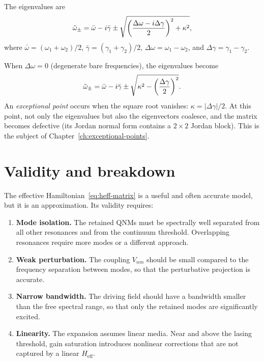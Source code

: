 The eigenvalues are
\begin{equation}
 \tilde{\omega}_\pm = \bar{\omega} - i\bar{\gamma}
 \pm \sqrt{\left(\frac{\Delta\omega - i\Delta\gamma}{2}\right)^2
 + \kappa^2},
 \label{eq:two-mode-evals}
\end{equation}
where $\bar{\omega} = (\omega_1+\omega_2)/2$,
$\bar{\gamma} = (\gamma_1+\gamma_2)/2$,
$\Delta\omega = \omega_1 - \omega_2$, and
$\Delta\gamma = \gamma_1 - \gamma_2$.

When $\Delta\omega = 0$ (degenerate bare frequencies), the eigenvalues
become
\begin{equation}
 \tilde{\omega}_\pm = \bar{\omega} - i\bar{\gamma}
 \pm \sqrt{\kappa^2 - \left(\frac{\Delta\gamma}{2}\right)^2}.
 \label{eq:two-mode-ep}
\end{equation}
An \emph{exceptional point} occurs when the square root vanishes:
$\kappa = |\Delta\gamma|/2$. At this point, not only the eigenvalues but
also the eigenvectors coalesce, and the matrix becomes defective (its
Jordan normal form contains a $2\times 2$ Jordan block). This is the
subject of Chapter~\ref{ch:exceptional-points}.


\section{Validity and breakdown}
\label{sec:cmt-validity}

The effective Hamiltonian~\eqref{eq:heff-matrix} is a useful and often
accurate model, but it is an approximation. Its validity requires:

\begin{enumerate}
 \item \textbf{Mode isolation.} The retained QNMs must be spectrally
 well separated from all other resonances and from the continuum
 threshold. Overlapping resonances require more modes or a different
 approach.

 \item \textbf{Weak perturbation.} The coupling $V_{nm}$ should be
 small compared to the frequency separation between modes, so that the
 perturbative projection is accurate.

 \item \textbf{Narrow bandwidth.} The driving field should have a
 bandwidth smaller than the free spectral range, so that only the
 retained modes are significantly excited.

 \item \textbf{Linearity.} The expansion assumes linear media. Near
 and above the lasing threshold, gain saturation introduces nonlinear
 corrections that are not captured by a linear $H_{\mathrm{eff}}$.
\end{enumerate}

